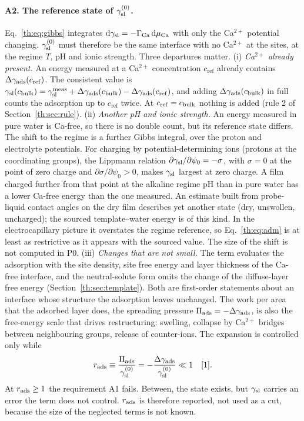 \paragraph{A2. The reference state of $\gamma_\mathrm{sl}^{(0)}$.} Eq.~\eqref{th:eq:gibbs} integrates
$\mathrm{d}\gamma_\mathrm{sl}=-\Gamma_\mathrm{Ca}\,\mathrm{d}\mu_\mathrm{Ca}$ with only the Ca$^{2+}$ potential changing. $\gamma_\mathrm{sl}^{(0)}$ must therefore
be the same interface with no Ca$^{2+}$ at the sites, at the regime $T$, pH and ionic strength.
Three departures matter.
(i) \emph{Ca$^{2+}$ already present.} An energy measured at a Ca$^{2+}$ concentration $c_\mathrm{ref}$
already contains $\Delta\gamma_\mathrm{ads}(c_\mathrm{ref})$. The consistent value is
$\gamma_\mathrm{sl}(c_\mathrm{bulk})=\gamma_\mathrm{sl}^\mathrm{meas}+\Delta\gamma_\mathrm{ads}(c_\mathrm{bulk})-\Delta\gamma_\mathrm{ads}(c_\mathrm{ref})$, and adding $\Delta\gamma_\mathrm{ads}(c_\mathrm{bulk})$ in full counts
the adsorption up to $c_\mathrm{ref}$ twice. At $c_\mathrm{ref}=c_\mathrm{bulk}$ nothing is added (rule 2 of
Section~\ref{th:sec:rule}).
(ii) \emph{Another pH and ionic strength.} An energy measured in pure water is Ca-free, so there is no
double count, but its reference state differs. The shift to the regime is a further Gibbs integral, over
the proton and electrolyte potentials. For charging by potential-determining ions (protons at the
coordinating groups), the Lippmann relation $\partial\gamma_\mathrm{sl}/\partial\psi_0=-\sigma$, with $\sigma=0$ at
the point of zero charge and $\partial\sigma/\partial\psi_0>0$, makes $\gamma_\mathrm{sl}$ largest at zero charge. A
film charged further from that point at the alkaline regime pH than in pure water has a lower Ca-free
energy than the one measured. An estimate built from probe-liquid contact angles on the dry film
describes yet another state (dry, unswollen, uncharged); the sourced template--water energy is of this
kind. In the electrocapillary picture it overstates the regime reference, so Eq.~\eqref{th:eq:adm} is
at least as restrictive as it appears with the sourced value. The size of the shift is not computed in
P0.
(iii) \emph{Changes that are not small.} The term evaluates the adsorption with the site density, site
free energy and layer thickness of the Ca-free interface, and the neutral-solute form omits the change
of the diffuse-layer free energy (Section~\ref{th:sec:template}). Both are first-order statements about
an interface whose structure the adsorption leaves unchanged. The work per area that the adsorbed layer
does, the spreading pressure $\Pi_\mathrm{ads}=-\Delta\gamma_\mathrm{ads}$, is also the free-energy scale that drives restructuring:
swelling, collapse by Ca$^{2+}$ bridges between neighbouring groups, release of counter-ions. The
expansion is controlled only while
\begin{equation}\label{th:eq:radm}
r_\mathrm{ads}\equiv\frac{\Pi_\mathrm{ads}}{\gamma_\mathrm{sl}^{(0)}}=-\frac{\Delta\gamma_\mathrm{ads}}{\gamma_\mathrm{sl}^{(0)}}\ll1 \quad[\mathrm{1}].
\end{equation}
At $r_\mathrm{ads}\ge1$ the requirement A1 fails. Between, the state exists, but $\gamma_\mathrm{sl}$ carries an error the term
does not control. $r_\mathrm{ads}$ is therefore reported, not used as a cut, because the size of the neglected
terms is not known.

